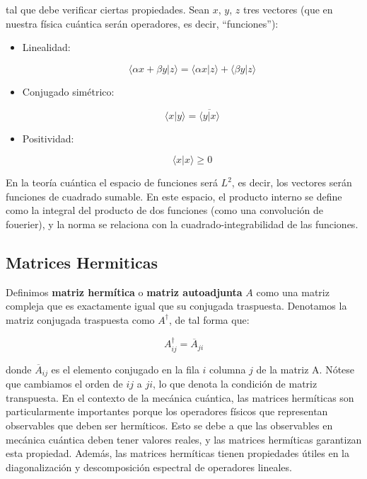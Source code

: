 \documentclass[12pt]{article}
\begin{document}
tal que debe verificar ciertas propiedades. Sean $x$, $y$, $z$ tres vectores (que en nuestra física cuántica serán operadores, es decir, ``funciones''):

\begin{itemize}
\item Linealidad:

\begin{equation}
\langle \alpha x + \beta y | z \rangle = 
\langle \alpha x | z \rangle + 
\langle \beta y | z \rangle
\end{equation}

\item Conjugado simétrico:

\begin{equation}
\langle x | y \rangle =  \overline{\langle y | x \rangle}
\end{equation}

\item Positividad:

\begin{equation}
\langle x | x \rangle \geq 0
\end{equation}
\end{itemize}

En la teoría cuántica el espacio de funciones será $L^2$, es decir, los vectores serán funciones de cuadrado sumable. En este espacio, el producto interno se define como la integral del producto de dos funciones (como una convolución de fouerier), y la norma se relaciona con la cuadrado-integrabilidad de las funciones.

\subsection{Matrices Hermiticas}

Definimos \textbf{matriz hermítica} o \textbf{matriz autoadjunta} $A$ como una matriz compleja que es exactamente igual que su conjugada traspuesta. Denotamos la matriz conjugada traspuesta como $A^\dagger$, de tal forma que:

\begin{equation}
A^\dagger_{ij} = \overline{A}_{ji}
\end{equation}

donde $\overline{A}_{ij}$ es el elemento conjugado en la fila $i$ columna $j$ de la matriz A. Nótese que cambiamos el orden de $ij$ a $ji$, lo que denota la condición de matriz transpuesta. En el contexto de la mecánica cuántica, las matrices hermíticas son particularmente importantes porque los operadores físicos que representan observables que deben ser hermíticos. Esto se debe a que las observables en mecánica cuántica deben tener valores reales, y las matrices hermíticas garantizan esta propiedad. Además, las matrices hermíticas tienen propiedades útiles en la diagonalización y descomposición espectral de operadores lineales. \\
\end{document}
